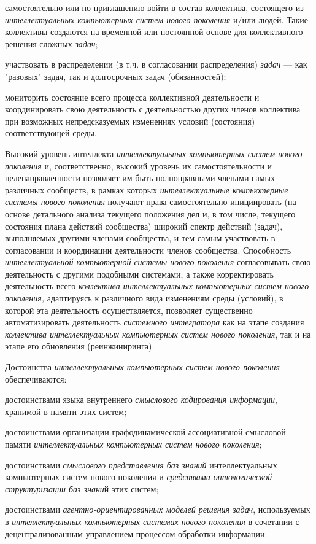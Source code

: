 \begin{textitemize}
	\item самостоятельно или по приглашению войти в состав коллектива, состоящего из \textit{интеллектуальных компьютерных систем нового поколения} и/или людей. Такие коллективы создаются на временной или постоянной основе для коллективного решения сложных \textit{задач};
	\item участвовать в распределении (в т.ч. в согласовании распределения) \textit{задач} --- как "разовых"{} задач, так и долгосрочных задач (обязанностей);
	\item мониторить состояние всего процесса коллективной деятельности и координировать свою деятельность с деятельностью других членов коллектива при возможных непредсказуемых изменениях условий (состояния) соответствующей среды.
\end{textitemize}

Высокий уровень интеллекта \textit{интеллектуальных компьютерных систем нового поколения} и, соответственно, высокий уровень их самостоятельности и целенаправленности позволяет им быть полноправными членами самых различных сообществ, в рамках которых \textit{интеллектуальные компьютерные системы нового поколения} получают права самостоятельно инициировать (на основе детального анализа текущего положения дел и, в том числе, текущего состояния плана действий сообщества) широкий спектр действий (задач), выполняемых другими членами сообщества, и тем самым участвовать в согласовании и координации деятельности членов сообщества. Способность \textit{интеллектуальной компьютерной системы нового поколения} согласовывать свою деятельность с другими подобными системами, а также корректировать деятельность всего \textit{коллектива интеллектуальных компьютерных систем нового поколения,} адаптируясь к различного вида изменениям среды (условий), в которой эта деятельность осуществляется, позволяет существенно автоматизировать деятельность \textit{системного интегратора} как на этапе создания \textit{коллектива интеллектуальных компьютерных систем нового поколения}, так и на этапе его обновления (реинжиниринга).

Достоинства \textit{интеллектуальных компьютерных систем нового поколения} обеспечиваются:

\begin{textitemize}
	\item достоинствами языка внутреннего \textit{смыслового кодирования информации}, хранимой в памяти этих систем;
	\item достоинствами организации графодинамической ассоциативной смысловой памяти \textit{интеллектуальных компьютерных систем нового поколения};
	\item достоинствами \textit{смыслового представления баз знаний} интеллектуальных компьютерных систем нового поколения и \textit{средствами онтологической структуризации баз знани}й этих систем;
	\item достоинствами \textit{агентно-ориентированных моделей решения задач}, используемых в \textit{интеллектуальных компьютерных системах нового поколения} в сочетании с децентрализованным управлением процессом обработки информации.
\end{textitemize}

